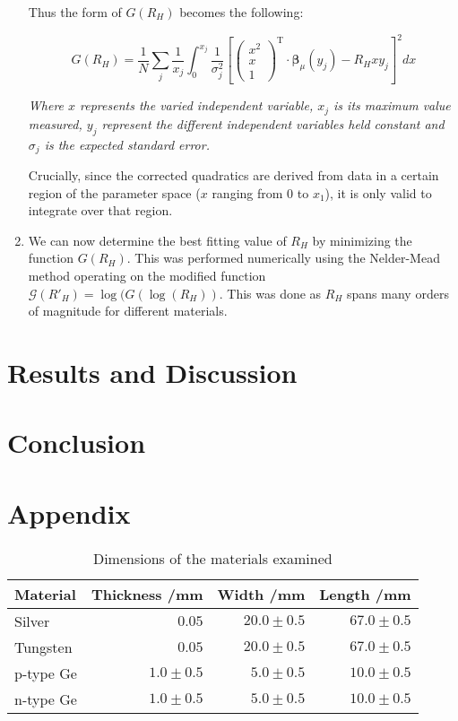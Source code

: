 \documentclass{article}
\begin{document}
\begin{enumerate}
			\noindent Thus the form of $G(R_H)$ becomes the following:
			
			\begin{equation}
				G(R_H) = \frac{1}{N}\sum_j\frac{1}{x_j}\int_{0}^{x_j}\frac{1}{\sigma_j^2}\left[\begin{pmatrix} x^2 \\ x \\ 1\end{pmatrix}^\mathrm{T}\cdot\boldsymbol{\beta}_\mu(y_j) - R_Hxy_j\right]^2 dx
			\end{equation}
			\begin{center}\emph{Where $x$ represents the varied independent variable, $x_j$ is its maximum value measured, $y_j$ represent the different independent variables held constant and $\sigma_j$ is the expected standard error.}\end{center}
			
			\noindent Crucially, since the corrected quadratics are derived from data in a certain region of the parameter space ($x$ ranging from $0$ to $x_1$), it is only valid to integrate over that region.
			
			\item We can now determine the best fitting value of $R_H$ by minimizing the function $G(R_H)$. This was performed numerically using the Nelder-Mead method operating on the modified function $\mathcal{G}(R'_H) = \log(G(\log(R_H))$. This was done as $R_H$ spans many orders of magnitude for different materials.
		\end{enumerate}
	
	\section{Results and Discussion}
		
	
	\section{Conclusion}
	
	\newpage
	\appendix
	\section{Appendix}
	
	\begin{table}[h!]
		\begin{center}
			\begin{tabular}{|l|r|r|r|} 
			\hline
			Material  & Thickness /mm & Width /mm    & Length /mm   \\ \hline
			Silver    & $0.05$        & $20.0\pm0.5$ & $67.0\pm0.5$ \\
			Tungsten  & $0.05$        & $20.0\pm0.5$ & $67.0\pm0.5$ \\
			p-type Ge & $1.0\pm0.5$   & $5.0\pm0.5$      & $10.0\pm0.5$ \\
			n-type Ge & $1.0\pm0.5$   & $5.0\pm0.5$      & $10.0\pm0.5$ \\ \hline	
			\end{tabular}
		\end{center}
		\caption{Dimensions of the materials examined}
		\label{table:dimensions}
	\end{table}
	
\end{document}
